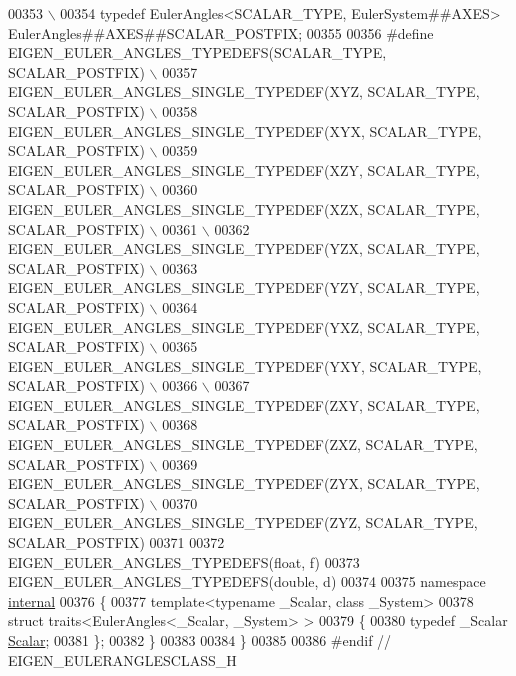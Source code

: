 \begin{DoxyCode}
00353 \textcolor{preprocessor}{ \(\backslash\)}
00354 \textcolor{preprocessor}{  typedef EulerAngles<SCALAR\_TYPE, EulerSystem##AXES> EulerAngles##AXES##SCALAR\_POSTFIX;}
00355 
00356 \textcolor{preprocessor}{#define EIGEN\_EULER\_ANGLES\_TYPEDEFS(SCALAR\_TYPE, SCALAR\_POSTFIX) \(\backslash\)}
00357 \textcolor{preprocessor}{  EIGEN\_EULER\_ANGLES\_SINGLE\_TYPEDEF(XYZ, SCALAR\_TYPE, SCALAR\_POSTFIX) \(\backslash\)}
00358 \textcolor{preprocessor}{  EIGEN\_EULER\_ANGLES\_SINGLE\_TYPEDEF(XYX, SCALAR\_TYPE, SCALAR\_POSTFIX) \(\backslash\)}
00359 \textcolor{preprocessor}{  EIGEN\_EULER\_ANGLES\_SINGLE\_TYPEDEF(XZY, SCALAR\_TYPE, SCALAR\_POSTFIX) \(\backslash\)}
00360 \textcolor{preprocessor}{  EIGEN\_EULER\_ANGLES\_SINGLE\_TYPEDEF(XZX, SCALAR\_TYPE, SCALAR\_POSTFIX) \(\backslash\)}
00361 \textcolor{preprocessor}{ \(\backslash\)}
00362 \textcolor{preprocessor}{  EIGEN\_EULER\_ANGLES\_SINGLE\_TYPEDEF(YZX, SCALAR\_TYPE, SCALAR\_POSTFIX) \(\backslash\)}
00363 \textcolor{preprocessor}{  EIGEN\_EULER\_ANGLES\_SINGLE\_TYPEDEF(YZY, SCALAR\_TYPE, SCALAR\_POSTFIX) \(\backslash\)}
00364 \textcolor{preprocessor}{  EIGEN\_EULER\_ANGLES\_SINGLE\_TYPEDEF(YXZ, SCALAR\_TYPE, SCALAR\_POSTFIX) \(\backslash\)}
00365 \textcolor{preprocessor}{  EIGEN\_EULER\_ANGLES\_SINGLE\_TYPEDEF(YXY, SCALAR\_TYPE, SCALAR\_POSTFIX) \(\backslash\)}
00366 \textcolor{preprocessor}{ \(\backslash\)}
00367 \textcolor{preprocessor}{  EIGEN\_EULER\_ANGLES\_SINGLE\_TYPEDEF(ZXY, SCALAR\_TYPE, SCALAR\_POSTFIX) \(\backslash\)}
00368 \textcolor{preprocessor}{  EIGEN\_EULER\_ANGLES\_SINGLE\_TYPEDEF(ZXZ, SCALAR\_TYPE, SCALAR\_POSTFIX) \(\backslash\)}
00369 \textcolor{preprocessor}{  EIGEN\_EULER\_ANGLES\_SINGLE\_TYPEDEF(ZYX, SCALAR\_TYPE, SCALAR\_POSTFIX) \(\backslash\)}
00370 \textcolor{preprocessor}{  EIGEN\_EULER\_ANGLES\_SINGLE\_TYPEDEF(ZYZ, SCALAR\_TYPE, SCALAR\_POSTFIX)}
00371 
00372 EIGEN\_EULER\_ANGLES\_TYPEDEFS(\textcolor{keywordtype}{float}, f)
00373 EIGEN\_EULER\_ANGLES\_TYPEDEFS(\textcolor{keywordtype}{double}, d)
00374 
00375   \textcolor{keyword}{namespace }\hyperlink{namespaceinternal}{internal}
00376   \{
00377     \textcolor{keyword}{template}<\textcolor{keyword}{typename} \_Scalar, \textcolor{keyword}{class} \_System>
00378     \textcolor{keyword}{struct }traits<EulerAngles<\_Scalar, \_System> >
00379     \{
00380       \textcolor{keyword}{typedef} \_Scalar \hyperlink{class_eigen_1_1_euler_angles_a2ab1d433ac9683268446f8905ac31aac}{Scalar};
00381     \};
00382   \}
00383   
00384 \}
00385 
00386 \textcolor{preprocessor}{#endif // EIGEN\_EULERANGLESCLASS\_H}
\end{DoxyCode}
